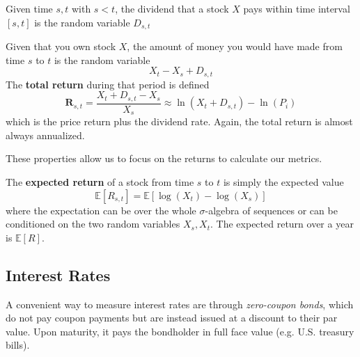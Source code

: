 \documentclass{article}
\begin{document}
    \begin{definition}[Dividend]
      Given time $s, t$ with $s < t$, the dividend that a stock $X$ pays within time interval $[s, t]$ is the random variable $D_{s, t}$
    \end{definition}

    \begin{definition}
      Given that you own stock $X$, the amount of money you would have made from time $s$ to $t$ is the random variable 
      \begin{equation}
        X_t - X_s + D_{s, t}
      \end{equation}
      The \textbf{total return} during that period is defined 
      \begin{equation}
        \mathbf{R}_{s, t} = \frac{X_t + D_{s, t} - X_s}{X_s} \approx \ln(X_t + D_{s, t}) - \ln (P_i)
      \end{equation}
      which is the price return plus the dividend rate. Again, the total return is almost always annualized.   
    \end{definition}

    These properties allow us to focus on the returns to calculate our metrics. 

    \begin{definition}
      The \textbf{expected return} of a stock from time $s$ to $t$ is simply the expected value 
      \begin{equation}
        \mathbb{E}[R_{s, t}] = \mathbb{E} [ \log(X_t) - \log(X_s) ]
      \end{equation}
      where the expectation can be over the whole $\sigma$-algebra of sequences or can be conditioned on the two random variables $X_s, X_t$. The expected return over a year is $\mathbb{E}[R]$. 
    \end{definition}
  
  \subsection{Interest Rates}

    \begin{definition}
      A convenient way to measure interest rates are through \textit{zero-coupon bonds}, which do not pay coupon payments but are instead issued at a discount to their par value. Upon maturity, it pays the bondholder in full face value (e.g. U.S. treasury bills). 
    \end{definition}
\end{document}
